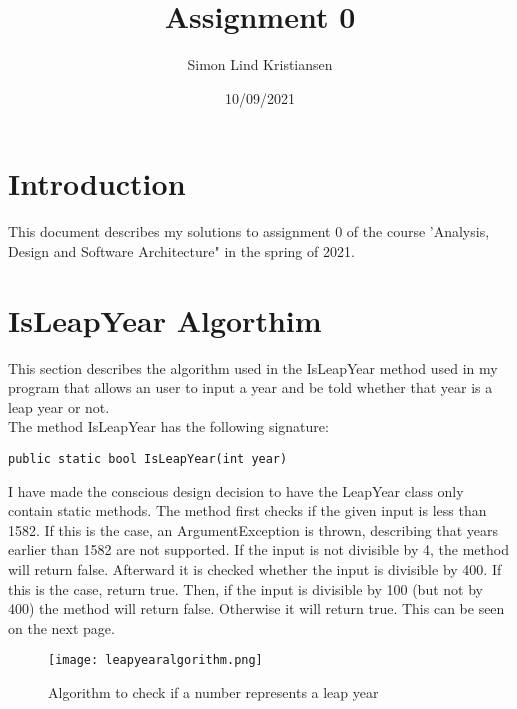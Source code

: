 \documentclass{article}
\title{Assignment 0}
\author{Simon Lind Kristiansen}
\date{10/09/2021}
\begin{document}
\maketitle

\section{Introduction}
This document describes my solutions to assignment 0 of the course 'Analysis, Design and Software Architecture" in the spring of 2021.

\section{IsLeapYear Algorthim}
This section describes the algorithm used in the IsLeapYear method used in my program that allows an user to input a year and be told whether that year is a leap year or not. \\
The method IsLeapYear has the following signature: \

\begin{verbatim}
public static bool IsLeapYear(int year)
\end{verbatim} 

I have made the conscious design decision to have the LeapYear class only contain static methods. The method first checks if the given input is less than 1582. If this is the case, an ArgumentException is thrown, describing that years earlier than 1582 are not supported. If the input is not divisible by 4, the method will return false. Afterward it is checked whether the input is divisible by 400. If this is the case, return true. Then, if the input is divisible by 100 (but not by 400) the method will return false. Otherwise it will return true. This can be seen on the next page.

\begin{figure}[htbp]
  \centering
  \texttt{[image: leapyearalgorithm.png]}
  \caption{Algorithm to check if a number represents a leap  year}
\end{figure}
\end{document}
